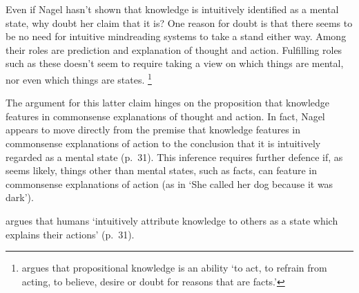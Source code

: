 \documentclass[11pt,a4paper]{extarticle}
\begin{document}
Even if Nagel hasn't shown that knowledge is intuitively identified as a mental state, why doubt her claim that it is?
One reason for doubt is that there seems to be no need for intuitive mindreading systems to take a stand either way.
Among their roles are prediction and explanation of thought and action.
Fulfilling roles such as these doesn't seem to require taking a view on which things are mental, nor even which things are states.%
\footnote{
\citet[p.\ 451]{Hyman:1999fk} argues that propositional knowledge is an ability `to act, to refrain from acting, to believe, desire or doubt for reasons that are facts.' 
}




The argument for this latter claim hinges on the proposition that knowledge features in commonsense explanations of thought and action.
In fact,
Nagel appears to move directly from the premise that knowledge features in commonsense explanations of action to the conclusion that it  is intuitively regarded as a mental state (p.\ 31).
This inference requires further defence if, as seems likely, things other than mental states, such as facts, can feature in commonsense explanations of action (as in `She called her dog because it was dark').



argues that humans `intuitively attribute knowledge to others as a state which explains their actions' (p.\ 31).
\end{document}
